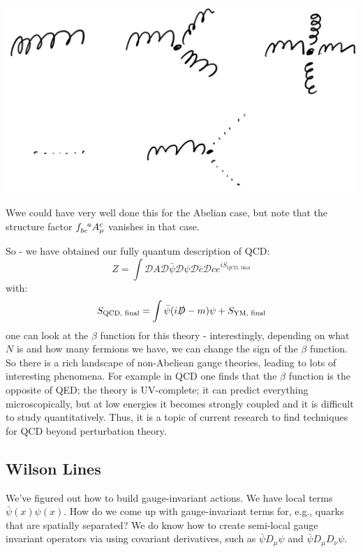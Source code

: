 \begin{center}
    \includegraphics[scale=0.35]{Lectures/Images/lec17-gluonghosts.png}
\end{center}

Wwe could have very well done this for the Abelian case, but note that the structure factor $f_{bc}^{\sp\sp a} A_\mu^c$ vanishes in that case.

So - we have obtained our fully quantum description of QCD:
\begin{equation}
    Z = \int \mathcal{D}A\mathcal{D}\bar{\psi}\mathcal{D}\psi \mathcal{D}\bar{c}\mathcal{D}c e^{iS_{\text{QCD, final}}}
\end{equation}
with:
\begin{equation}
    S_{\text{QCD, final}} = \int \bar{\psi}(i\slashed{D} - m)\psi + S_{\text{YM, final}}
\end{equation}
one can look at the $\beta$ function for this theory - interestingly, depending on what $N$ is and how many fermions we have, we can change the sign of the $\beta$ function. So there is a rich landscape of non-Abeliean gauge theories, leading to lots of interesting phenomena. For example in QCD one finds that the $\beta$ function is the opposite of QED; the theory is UV-complete; it can predict everything microscopically, but at low energies it becomes strongly coupled and it is difficult to study quantitatively. Thus, it is a topic of current research to find techniques for QCD beyond perturbation theory.

\subsection{Wilson Lines}
We've figured out how to build gauge-invariant actions. We have local terms $\bar{\psi}(x)\psi(x)$. How do we come up with gauge-invariant terms for, e.g., quarks that are spatially separated? We do know how to create semi-local gauge invariant operators via using covariant derivatives, such as $\bar{\psi}D_\mu \psi$ and $\bar{\psi}D_\mu D_\nu \psi$.

